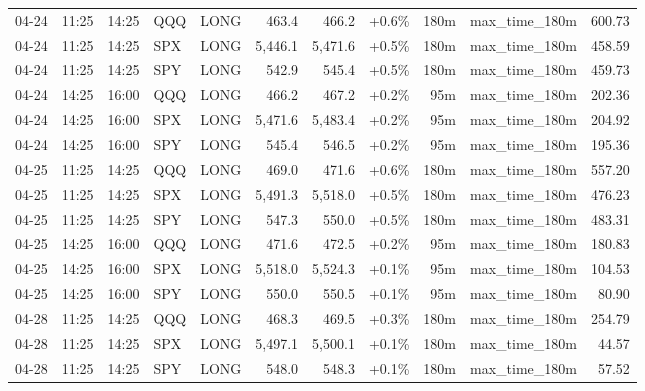 \documentclass[11pt,a4paper,twoside]{article}
\begin{document}
\begin{center}
\begin{longtable}{>{\color{txtmain}}l l l l l r r r r >{\color{txtmain}}l r}
04-24 & 11:25 & 14:25 & QQQ & LONG & 463.4 & 466.2 & \textcolor{wingreen}{+0.6\%} & 180m & max\_time\_180m & \textcolor{wingreen}{600.73} \\
04-24 & 11:25 & 14:25 & SPX & LONG & 5,446.1 & 5,471.6 & \textcolor{wingreen}{+0.5\%} & 180m & max\_time\_180m & \textcolor{wingreen}{458.59} \\
04-24 & 11:25 & 14:25 & SPY & LONG & 542.9 & 545.4 & \textcolor{wingreen}{+0.5\%} & 180m & max\_time\_180m & \textcolor{wingreen}{459.73} \\
04-24 & 14:25 & 16:00 & QQQ & LONG & 466.2 & 467.2 & \textcolor{wingreen}{+0.2\%} & 95m & max\_time\_180m & \textcolor{wingreen}{202.36} \\
04-24 & 14:25 & 16:00 & SPX & LONG & 5,471.6 & 5,483.4 & \textcolor{wingreen}{+0.2\%} & 95m & max\_time\_180m & \textcolor{wingreen}{204.92} \\
04-24 & 14:25 & 16:00 & SPY & LONG & 545.4 & 546.5 & \textcolor{wingreen}{+0.2\%} & 95m & max\_time\_180m & \textcolor{wingreen}{195.36} \\
04-25 & 11:25 & 14:25 & QQQ & LONG & 469.0 & 471.6 & \textcolor{wingreen}{+0.6\%} & 180m & max\_time\_180m & \textcolor{wingreen}{557.20} \\
04-25 & 11:25 & 14:25 & SPX & LONG & 5,491.3 & 5,518.0 & \textcolor{wingreen}{+0.5\%} & 180m & max\_time\_180m & \textcolor{wingreen}{476.23} \\
04-25 & 11:25 & 14:25 & SPY & LONG & 547.3 & 550.0 & \textcolor{wingreen}{+0.5\%} & 180m & max\_time\_180m & \textcolor{wingreen}{483.31} \\
04-25 & 14:25 & 16:00 & QQQ & LONG & 471.6 & 472.5 & \textcolor{wingreen}{+0.2\%} & 95m & max\_time\_180m & \textcolor{wingreen}{180.83} \\
04-25 & 14:25 & 16:00 & SPX & LONG & 5,518.0 & 5,524.3 & \textcolor{wingreen}{+0.1\%} & 95m & max\_time\_180m & \textcolor{wingreen}{104.53} \\
04-25 & 14:25 & 16:00 & SPY & LONG & 550.0 & 550.5 & \textcolor{wingreen}{+0.1\%} & 95m & max\_time\_180m & \textcolor{wingreen}{80.90} \\
04-28 & 11:25 & 14:25 & QQQ & LONG & 468.3 & 469.5 & \textcolor{wingreen}{+0.3\%} & 180m & max\_time\_180m & \textcolor{wingreen}{254.79} \\
04-28 & 11:25 & 14:25 & SPX & LONG & 5,497.1 & 5,500.1 & \textcolor{wingreen}{+0.1\%} & 180m & max\_time\_180m & \textcolor{wingreen}{44.57} \\
04-28 & 11:25 & 14:25 & SPY & LONG & 548.0 & 548.3 & \textcolor{wingreen}{+0.1\%} & 180m & max\_time\_180m & \textcolor{wingreen}{57.52} \\

\end{longtable}
\end{center}
\end{document}
